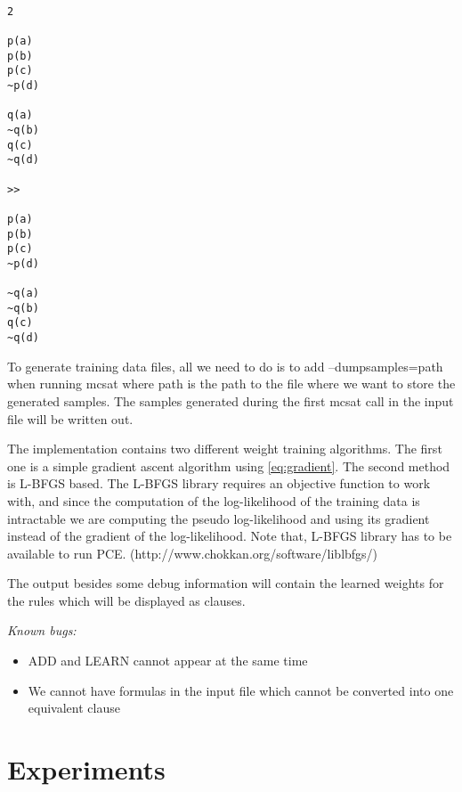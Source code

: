 \documentclass[12pt]{article}
\begin{document}
\begin{verbatim}

2

p(a)
p(b)
p(c)
~p(d)

q(a)
~q(b)
q(c)
~q(d)

>>

p(a)
p(b)
p(c)
~p(d)

~q(a)
~q(b)
q(c)
~q(d)

\end{verbatim}

To generate training data files, all we need to do is to add 
--dumpsamples=path when running mcsat where path is the path to the file
where we want to store the generated samples. The samples generated during
the first mcsat call in the input file will be written out. 

The implementation contains two different weight training algorithms. The first
one is a simple gradient ascent algorithm using \eqref{eq:gradient}. The second
method is L-BFGS based. The L-BFGS library requires an objective function to
work with, and since the computation of the log-likelihood of the training data
is intractable we are computing the pseudo log-likelihood and using its gradient
instead of the gradient of the log-likelihood.
Note that, L-BFGS library has to be available to run PCE. 
(http://www.chokkan.org/software/liblbfgs/)

The output besides some debug information will contain the learned weights for
the rules which will be displayed as clauses.

\emph{Known bugs:}
\begin{itemize}
   \item ADD and LEARN cannot appear at the same time
   \item We cannot have formulas in the input file which cannot be converted
         into one equivalent clause
\end{itemize}

\section{Experiments}
\end{document}
